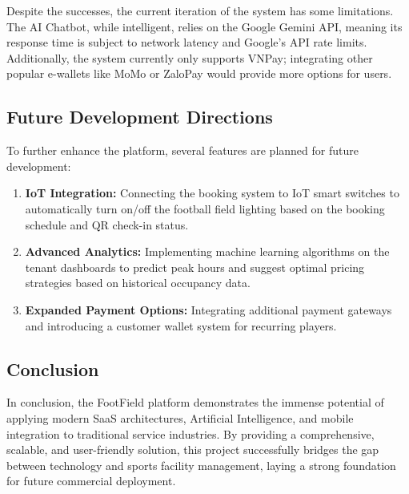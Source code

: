 Despite the successes, the current iteration of the system has some limitations. The AI Chatbot, while intelligent, relies on the Google Gemini API, meaning its response time is subject to network latency and Google's API rate limits. Additionally, the system currently only supports VNPay; integrating other popular e-wallets like MoMo or ZaloPay would provide more options for users.

\subsection{Future Development Directions}

To further enhance the platform, several features are planned for future development:
\begin{enumerate}
    \item \textbf{IoT Integration:} Connecting the booking system to IoT smart switches to automatically turn on/off the football field lighting based on the booking schedule and QR check-in status.
    \item \textbf{Advanced Analytics:} Implementing machine learning algorithms on the tenant dashboards to predict peak hours and suggest optimal pricing strategies based on historical occupancy data.
    \item \textbf{Expanded Payment Options:} Integrating additional payment gateways and introducing a customer wallet system for recurring players.
\end{enumerate}

\subsection{Conclusion}

In conclusion, the FootField platform demonstrates the immense potential of applying modern SaaS architectures, Artificial Intelligence, and mobile integration to traditional service industries. By providing a comprehensive, scalable, and user-friendly solution, this project successfully bridges the gap between technology and sports facility management, laying a strong foundation for future commercial deployment.